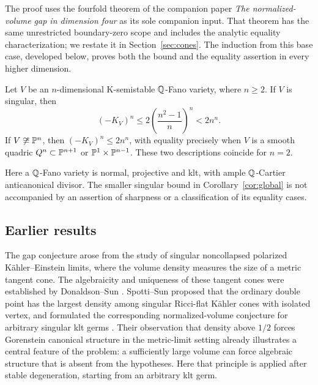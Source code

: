 The proof uses the fourfold theorem of the companion paper
\emph{The normalized-volume gap in dimension four}
\cite[Theorem~1.1]{FourfoldCompanion} as its sole companion input.
That theorem has the same unrestricted boundary-zero scope and includes
the analytic equality characterization; we restate it in
Section~\ref{sec:cones}. The induction from this base case, developed
below, proves both the bound and the equality assertion in every higher
dimension.

\begin{corollary}\label{cor:global}
Let \(V\) be an \(n\)-dimensional
K-semistable \(\mathbb Q\)-Fano variety, where \(n\ge2\).
If \(V\) is singular, then
\[
       (-K_V)^n\le
       2\left(\frac{n^2-1}{n}\right)^n<2n^n.
\]
If \(V\not\cong\mathbb P^n\), then \((-K_V)^n\le2n^n\), with equality
precisely when \(V\) is a smooth quadric \(Q^n\subset\mathbb P^{n+1}\) or
\(\mathbb P^1\times\mathbb P^{n-1}\). These two descriptions coincide for \(n=2\).
\end{corollary}

Here a \(\mathbb Q\)-Fano variety is normal, projective and klt, with ample
\(\mathbb Q\)-Cartier anticanonical divisor. The smaller singular bound in
Corollary~\ref{cor:global} is not accompanied by an assertion of
sharpness or a classification of its equality cases.

\subsection{Earlier results}

The gap conjecture arose from the study of singular noncollapsed
polarized K\"ahler--Einstein limits, where the volume density measures the
size of a metric tangent cone. The algebraicity and uniqueness of
these tangent cones were established by Donaldson--Sun
\cite{DonaldsonSun17}. Spotti--Sun proposed that the ordinary double
point has the largest density among singular Ricci-flat K\"ahler
cones with isolated vertex, and formulated the corresponding
normalized-volume conjecture for arbitrary singular klt germs
\cite[Conjectures~1.2 and~5.5]{SpottiSun17}. Their observation that
density above \(1/2\) forces Gorenstein canonical structure in the
metric-limit setting \cite[Proposition~3.7]{SpottiSun17} already
illustrates a central feature of the problem: a sufficiently large
volume can force algebraic structure that is absent from the
hypotheses. Here that principle is applied after stable degeneration,
starting from an arbitrary klt germ.

